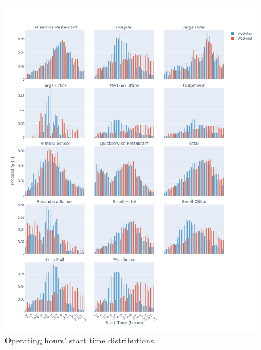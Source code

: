 %
\begin{figure}
   \centering \includegraphics[width=1\textwidth]{figures/start_time.png}
   \caption{Operating hours' start time distributions.}
    \label{fig:start_time}
\end{figure}

